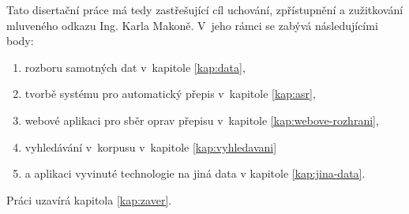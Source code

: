 Tato disertační práce má tedy zastřešující cíl uchování, zpřístupnění a
zužitkování mluveného odkazu Ing. Karla Makoně. V~jeho rámci se zabývá
následujícími body:

\begin{enumerate}
\item{rozboru samotných dat v~kapitole \ref{kap:data},}
\item{tvorbě systému pro automatický přepis v~kapitole \ref{kap:asr},}
\item{webové aplikaci pro sběr oprav přepisu v~kapitole \ref{kap:webove-rozhrani},}
\item{vyhledávání v~korpusu v~kapitole \ref{kap:vyhledavani}}
\item{a aplikaci vyvinuté technologie na jiná data v kapitole \ref{kap:jina-data}.}
\end{enumerate}

Práci uzavírá kapitola \ref{kap:zaver}.
